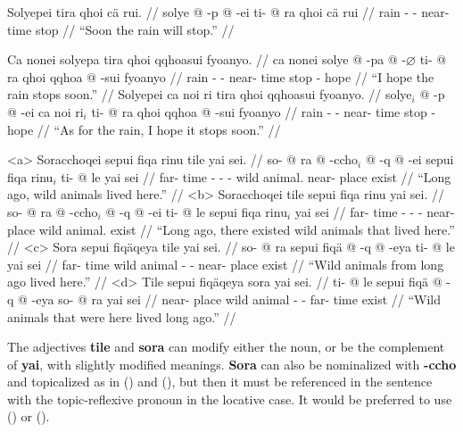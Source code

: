 \documentclass{article}
\begin{document}
\ex[lingstyle=QuCheanya] \begingl
\glpreamble Solyepei tira qhoi c\"a rui. //
\gla solye @ -p @ -ei ti- @ ra qhoi c\"a rui //
\glb rain - - near- time stop   //
\glft ``Soon the rain will stop.'' //
\endgl \xe

\pex[lingstyle=QuCheanya] 
\a \begingl
\glpreamble Ca nonei solyepa tira qhoi qqhoasui fyoanyo. //
\gla ca nonei solye @ -pa @ -$\varnothing$ ti- @ ra qhoi qqhoa @ -sui fyoanyo //
\glb {}  rain - - near- time stop  - hope //
\glft ``I hope the rain stops soon.'' //
\endgl
\a \begingl
\glpreamble Solyepei ca noi ri tira qhoi qqhoasui fyoanyo. //
\gla solye$_i$ @ -p @ -ei ca noi ri$_i$ ti- @ ra qhoi qqhoa @ -sui fyoanyo //
\glb rain - -    near- time stop  - hope //
\glft ``As for the rain, I hope it stops soon.'' //
\endgl \xe

\pex[lingstyle=QuCheanya,tag=animals] 
\a<a> \begingl
\glpreamble Soracchoqei sepui fiqa rinu tile yai sei. //
\gla so- @ ra @ -ccho$_i$ @ -q @ -ei sepui fiqa rinu$_i$ ti- @ le yai sei //
\glb far- time - - - wild animal.  near- place exist  //
\glft ``Long ago, wild animals lived here.'' //
\endgl 
\a<b> \begingl
\glpreamble Soracchoqei tile sepui fiqa rinu yai sei. //
\gla so- @ ra @ -ccho$_i$ @ -q @ -ei ti- @ le sepui fiqa rinu$_i$ yai sei //
\glb far- time - - - near- place wild animal.  exist  //
\glft ``Long ago, there existed wild animals that lived here.'' //
\endgl
\a<c> \begingl
\glpreamble Sora sepui fiq\"aqeya tile yai sei. //
\gla so- @ ra sepui fiq\"a @ -q @ -eya ti- @ le yai sei //
\glb far- time wild animal - - near- place exist  //
\glft ``Wild animals from long ago lived here.'' //
\endgl
\a<d> \begingl
\glpreamble Tile sepui fiq\"aqeya sora yai sei. //
\gla ti- @ le sepui fiq\"a @ -q @ -eya so- @ ra yai sei //
\glb near- place wild animal - - far- time exist  //
\glft ``Wild animals that were here lived long ago.'' //
\endgl
\xe

The adjectives \textbf{tile} and \textbf{sora} can modify either the noun, or be the complement of \textbf{yai}, with slightly modified meanings.  \textbf{Sora} can also be nominalized with \textbf{-ccho} and topicalized as in () and (), but then it must be referenced in the sentence with the topic-reflexive pronoun in the locative case. It would be preferred to use () or ().
\end{document}
